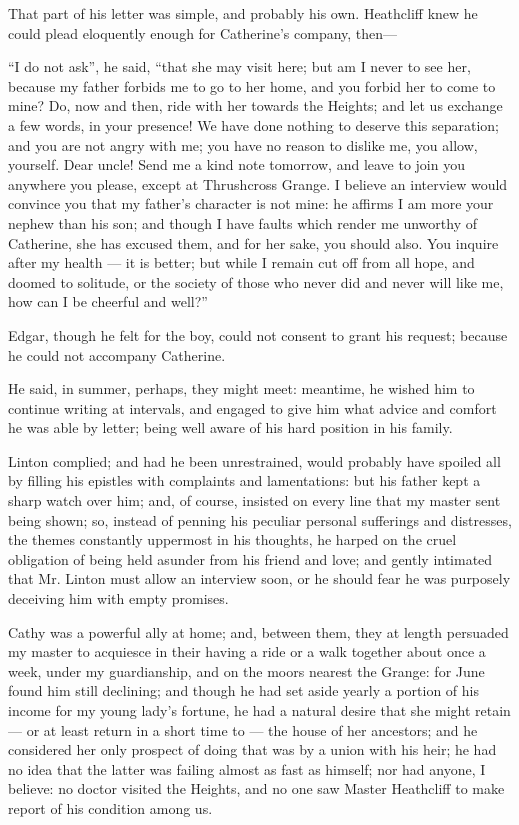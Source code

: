\par That part of his letter was simple, and probably his own. Heathcliff knew he could plead eloquently enough for Catherine's company, then—
\par “I do not ask”, he said, “that she may visit here; but am I never to see her, because my father forbids me to go to her home, and you forbid her to come to mine? Do, now and then, ride with her towards the Heights; and let us exchange a few words, in your presence! We have done nothing to deserve this separation; and you are not angry with me; you have no reason to dislike me, you allow, yourself. Dear uncle! Send me a kind note tomorrow, and leave to join you anywhere you please, except at Thrushcross Grange. I believe an interview would convince you that my father's character is not mine: he affirms I am more your nephew than his son; and though I have faults which render me unworthy of Catherine, she has excused them, and for her sake, you should also. You inquire after my health — it is better; but while I remain cut off from all hope, and doomed to solitude, or the society of those who never did and never will like me, how can I be cheerful and well?”
\par Edgar, though he felt for the boy, could not consent to grant his request; because he could not accompany Catherine.
\par He said, in summer, perhaps, they might meet: meantime, he wished him to continue writing at intervals, and engaged to give him what advice and comfort he was able by letter; being well aware of his hard position in his family.
\par Linton complied; and had he been unrestrained, would probably have spoiled all by filling his epistles with complaints and lamentations: but his father kept a sharp watch over him; and, of course, insisted on every line that my master sent being shown; so, instead of penning his peculiar personal sufferings and distresses, the themes constantly uppermost in his thoughts, he harped on the cruel obligation of being held asunder from his friend and love; and gently intimated that Mr. Linton must allow an interview soon, or he should fear he was purposely deceiving him with empty promises.
\par Cathy was a powerful ally at home; and, between them, they at length persuaded my master to acquiesce in their having a ride or a walk together about once a week, under my guardianship, and on the moors nearest the Grange: for June found him still declining; and though he had set aside yearly a portion of his income for my young lady's fortune, he had a natural desire that she might retain — or at least return in a short time to — the house of her ancestors; and he considered her only prospect of doing that was by a union with his heir; he had no idea that the latter was failing almost as fast as himself; nor had anyone, I believe: no doctor visited the Heights, and no one saw Master Heathcliff to make report of his condition among us.
